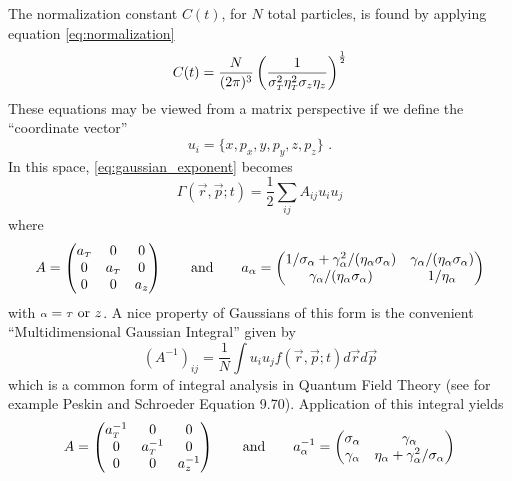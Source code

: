 The normalization constant $C(t)$, for $N$ total particles, is found by applying equation \ref{eq:normalization}
\begin{equation}
  C(t) = \frac{N}{(2\pi)^3} 
  \left( 
    \frac{1}{\sigma_{{\scriptscriptstyle T}}^2\eta_{{\scriptscriptstyle T}}^2\sigma_{z}\eta_{z}}
  \right)^{\frac{1}{2}}
\end{equation}
These equations may be viewed from a matrix perspective if we define the ``coordinate vector''
\begin{equation} \label{eq:coordinate_vector}
u_i = \{x, p_x, y, p_y, z, p_z\}\text{ .}
\end{equation}
In this space, \ref{eq:gaussian_exponent} becomes
\begin{equation}
  \Gamma(\vec{r}, \vec{p}; t) = \frac{1}{2}\sum\limits_{ij} A_{ij} u_i u_j
\end{equation}
where
\begin{equation}
  A = 
  \begin{pmatrix}
    a_{{\scriptscriptstyle T}} & 0 & 0 \\
    0 & a_{{\scriptscriptstyle T}} & 0 \\
    0 & 0 & a_{z}
  \end{pmatrix}
  \qquad \text{and} \qquad
  a_{\alpha} = 
  \begin{pmatrix}
    1/\sigma_{\alpha} + \gamma_{\alpha}^2/(\eta_{\alpha} \sigma_{\alpha}) & \gamma_{\alpha}/(\eta_{\alpha} \sigma_{\alpha}) \\
    \gamma_{\alpha}/(\eta_{\alpha} \sigma_{\alpha}) & 1/\eta_{\alpha}
  \end{pmatrix}
\end{equation}
with ${\scriptstyle \alpha} = {\scriptscriptstyle T} \text{ or } z$. 
A nice property of Gaussians of this form is the convenient ``Multidimensional Gaussian Integral'' given by
\begin{equation} \label{eq:gaussian_integral}
  (A^{-1})_{ij} = \frac{1}{N} \int u_i u_j f(\vec{r}, \vec{p}; t) d\vec{r} d\vec{p}
\end{equation}
which is a common form of integral analysis in Quantum Field Theory (see for example Peskin and Schroeder Equation 9.70). 
Application of this integral yields
\begin{equation}
  A = 
  \begin{pmatrix}
    a_{{\scriptscriptstyle T}}^{-1} & 0 & 0 \\
    0 & a_{{\scriptscriptstyle T}}^{-1} & 0 \\
    0 & 0 & a_{z}^{-1}
  \end{pmatrix}
  \qquad \text{and} \qquad
  a^{-1}_{\alpha} = 
  \begin{pmatrix}
    \sigma_{\alpha} & \gamma_{\alpha} \\
    \gamma_{\alpha} & \eta_{\alpha} + \gamma_{\alpha}^2/\sigma_{\alpha}
  \end{pmatrix}
\end{equation}
